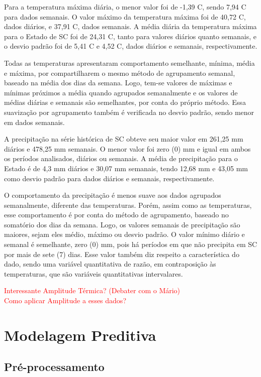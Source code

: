 \documentclass[
	12pt,				%
	openright,			%
	oneside,			%
	a4paper,			%
	english,			%
	french,				%
	spanish,			%
	brazil				%
	dvipsnames, table]{abntex2}
\begin{document}
\indent Para a temperatura máxima diária, o menor valor foi de -1,39 C, sendo 7,94 C para dados semanais. O valor máximo da temperatura máxima foi de 40,72 C, dados diários, e 37,91 C, dados semanais. A média diária da temperatura máxima para o Estado de \acrlong{SC} foi de 24,31 C, tanto para valores diários quanto semanais, e o desvio padrão foi de 5,41 C e 4,52 C, dados diários e semanais, respectivamente.

\indent Todas as temperaturas apresentaram comportamento semelhante, mínima, média e máxima, por compartilharem o mesmo método de agrupamento semanal, baseado na média dos dias da semana. Logo, tem-se valores de máximas e mínimas próximos a média quando agrupados semanalmente e os valores de médias diárias e semanais são semelhantes, por conta do próprio método. Essa suavização por agrupamento também é verificada no desvio padrão, sendo menor em dados semanais. 

\indent A precipitação na série histórica de \acrlong{SC} obteve seu maior valor em 261,25 mm diários e 478,25 mm semanais. O menor valor foi zero (0) mm e igual em ambos os períodos analisados, diários ou semanais. A média de precipitação para o Estado é de 4,3 mm diários e 30,07 mm semanais, tendo 12,68 mm e 43,05 mm como desvio padrão para dados diários e semanais, respectivamente.

\indent O comportamento da precipitação é menos suave aos dados agrupados semanalmente, diferente das temperaturas. Porém, assim como as temperaturas, esse comportamento é por conta do método de agrupamento, baseado no somatório dos dias da semana. Logo, os valores semanais de precipitação são maiores, sejam eles médio, máximo ou desvio padrão. O valor mínimo diário e semanal é semelhante, zero (0) mm, pois há períodos em que não precipita em \acrlong{SC} por mais de sete (7) dias. Esse valor também diz respeito a característica do dado, sendo uma variável quantitativa de razão, em contraposição às temperaturas, que são variáveis quantitativas intervalares.

\indent \textcolor{red}{Interessante Amplitude Térmica? (Debater com o Mário)\\
Como aplicar Amplitude a esses dados?}

\section{Modelagem Preditiva}

\subsection{Pré-processamento}
\end{document}
